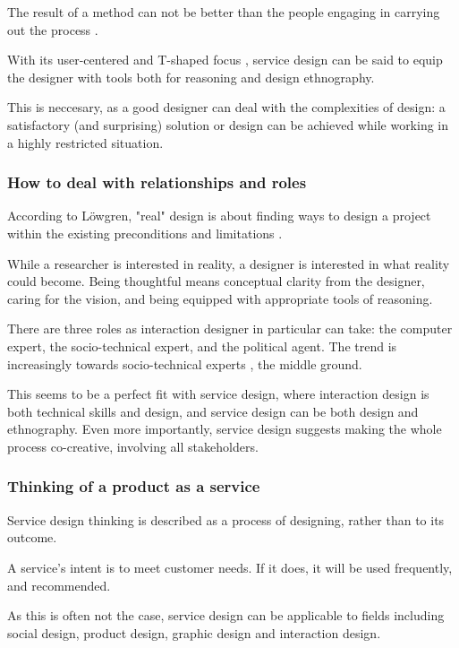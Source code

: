 The result of a method can not be better than the people engaging in carrying out the process \cite{lowgren}.

With its user-centered and T-shaped focus \cite{stickdorn}, service design can be said to equip the designer with tools both for reasoning and design ethnography.

This is neccesary, as a good designer can deal with the complexities of design: a satisfactory (and surprising) solution or design can be achieved while working in a highly restricted situation.

\subsubsection{How to deal with relationships and roles}
According to Löwgren, "real" design is about finding ways to design a project within the existing preconditions and limitations \cite{lowgren}.

While a researcher is interested in reality, a designer is interested in what reality could become. \cite{lowgren} Being thoughtful means conceptual clarity from the designer, caring for the vision, and being equipped with appropriate tools of reasoning.

There are three roles as interaction designer in particular can take: the computer expert, the socio-technical expert, and the political agent. The trend is increasingly towards socio-technical experts \cite{lowgren}, the middle ground.

This seems to be a perfect fit with service design, where interaction design is both technical skills and design, and service design can be both design and ethnography. Even more importantly, service design suggests making the whole process co-creative, involving all stakeholders. \cite{stickdorn}

\subsubsection{Thinking of a product as a service}

Service design thinking is described as a process of designing, rather than to its outcome.

A service's intent is to meet customer needs. If it does, it will be used frequently, and recommended. \cite{stickdorn}

As this is often not the case, service design can be applicable to fields including social design, product design, graphic design and interaction design.

